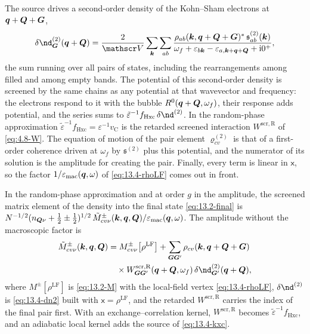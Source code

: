 The source drives a second-order density of the Kohn--Sham electrons at $\bm{q}+\bm{Q}+\bm{G}$,
\begin{equation}
  \delta\nd^{(2)}_{\vect{G}}(\vect{q}+\vect{Q}) = \frac{2}{\Vol}\sum_{\vect{k}}\sum_{ab}\frac{\rho_{ab}(\vect{k},\vect{q}+\vect{Q}+\vect{G})^*\,\mathfrak{s}^{(2)}_{ab}(\vect{k})}{\omega_f + \varepsilon_{b\vect{k}} - \varepsilon_{a,\vect{k}+\vect{q}+\vect{Q}} + \ii0^+} ,
  \label{eq:13.4-dn2}
\end{equation}
the sum running over all pairs of states, including the rearrangements among filled and among empty bands. The potential of this second-order density is screened by the same chains as any potential at that wavevector and frequency: the electrons respond to it with the bubble $R^0(\bm{q}+\bm{Q},\omega_f)$, their response adds potential, and the series sums to $\tilde\varepsilon^{-1}f_{\mathrm{Hxc}}\,\delta\nd^{(2)}$. In the random-phase approximation $\tilde\varepsilon^{-1}f_{\mathrm{Hxc}} = \varepsilon^{-1}v_{\mathrm{C}}$ is the retarded screened interaction $W^{\mathrm{scr,R}}$ of \cref{eq:4.8-W}. The equation of motion of the pair element $\varrho^{(2)}_{cv}$ is that of a first-order coherence driven at $\omega_f$ by $\mathfrak{s}^{(2)}$ plus this potential, and the numerator of its solution is the amplitude for creating the pair. Finally, every term is linear in $\mathsf{x}$, so the factor $1/\varepsilon_{\mathrm{mac}}(\bm{q},\omega)$ of \cref{eq:13.4-rhoLF} comes out in front.
\begin{keyresult}
In the random-phase approximation and at order $g$ in the amplitude, the screened matrix element of the density into the final state \cref{eq:13.2-final} is $N^{-1/2}(n_{\bm{Q}\nu} + \frac12 \pm \frac12)^{1/2}\,\tilde M^\pm_{cv\nu}(\bm{k},\bm{q},\bm{Q})/\varepsilon_{\mathrm{mac}}(\bm{q},\omega)$. The amplitude without the macroscopic factor is
\begin{equation}
  \begin{split}
  \tilde M^\pm_{cv\nu}(\vect{k},\vect{q},\vect{Q}) &= M^\pm_{cv\nu}\bigl[\rho^{\mathrm{LF}}\bigr] + \sum_{\vect{G}\vect{G}'}\rho_{cv}(\vect{k},\vect{q}+\vect{Q}+\vect{G})\\
  &\quad\times W^{\mathrm{scr,R}}_{\vect{G}\vect{G}'}(\vect{q}+\vect{Q},\omega_f)\,\delta\nd^{(2)}_{\vect{G}'}(\vect{q}+\vect{Q}) ,
  \end{split}
  \label{eq:13.4-Mscr}
\end{equation}
where $M^\pm[\rho^{\mathrm{LF}}]$ is \cref{eq:13.2-M} with the local-field vertex \cref{eq:13.4-rhoLF}, $\delta\nd^{(2)}$ is \cref{eq:13.4-dn2} built with $\mathsf{x} = \rho^{\mathrm{LF}}$, and the retarded $W^{\mathrm{scr,R}}$ carries the index of the final pair first. With an exchange--correlation kernel, $W^{\mathrm{scr,R}}$ becomes $\tilde\varepsilon^{-1}f_{\mathrm{Hxc}}$, and an adiabatic local kernel adds the source of \cref{eq:13.4-kxc}.
\end{keyresult}
